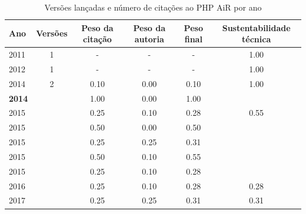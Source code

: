 \begin{table}[H]
\caption{Versões lançadas e número de citações ao PHP AiR por ano}
\centering
\begin{tabular}{| l | c | c | c | c | c |}
  \hline
  Ano & Versões & Peso da citação & Peso da autoria & Peso final & Sustentabilidade técnica \\
  \hline
        2011 & 1 & - & - & -
        &
          {\color{blue} 1.00}
        \\
\hline
        2012 & 1 & - & - & -
        &
          {\color{blue} 1.00}
        \\
\hline
            2014
          &
          2
          &
          0.10
          &
          0.00
          &
          0.10
          &
            {\color{blue} 1.00}
          \\
            {\bf 2014}
          &
          
          &
          1.00
          &
          0.00
          &
          1.00
          &
          \\
\hline
            2015
          &
          
          &
          0.25
          &
          0.10
          &
          0.28
          &
            {\color{blue} 0.55}
          \\
            2015
          &
          
          &
          0.50
          &
          0.00
          &
          0.50
          &
          \\
            2015
          &
          
          &
          0.25
          &
          0.25
          &
          0.31
          &
          \\
            2015
          &
          
          &
          0.50
          &
          0.10
          &
          0.55
          &
          \\
            2015
          &
          
          &
          0.25
          &
          0.10
          &
          0.28
          &
          \\
\hline
            2016
          &
          
          &
          0.25
          &
          0.10
          &
          0.28
          &
            {\color{red} 0.28}
          \\
\hline
            2017
          &
          
          &
          0.25
          &
          0.25
          &
          0.31
          &
            {\color{red} 0.31}
          \\
\hline
\end{tabular}
\end{table}

